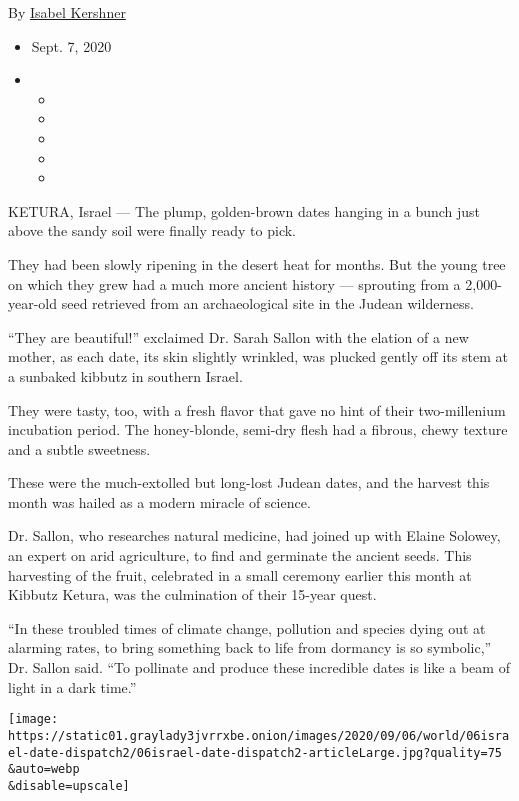 By \href{https://www.nytimes3xbfgragh.onion/by/isabel-kershner}{Isabel
Kershner}

\begin{itemize}
\item
  Sept. 7, 2020
\item
  \begin{itemize}
  \item
  \item
  \item
  \item
  \item
  \end{itemize}
\end{itemize}

KETURA, Israel --- The plump, golden-brown dates hanging in a bunch just
above the sandy soil were finally ready to pick.

They had been slowly ripening in the desert heat for months. But the
young tree on which they grew had a much more ancient history ---
sprouting from a 2,000-year-old seed retrieved from an archaeological
site in the Judean wilderness.

``They are beautiful!'' exclaimed Dr. Sarah Sallon with the elation of a
new mother, as each date, its skin slightly wrinkled, was plucked gently
off its stem at a sunbaked kibbutz in southern Israel.

They were tasty, too, with a fresh flavor that gave no hint of their
two-millenium incubation period. The honey-blonde, semi-dry flesh had a
fibrous, chewy texture and a subtle sweetness.

These were the much-extolled but long-lost Judean dates, and the harvest
this month was hailed as a modern miracle of science.

Dr. Sallon, who researches natural medicine, had joined up with Elaine
Solowey, an expert on arid agriculture, to find and germinate the
ancient seeds. This harvesting of the fruit, celebrated in a small
ceremony earlier this month at Kibbutz Ketura, was the culmination of
their 15-year quest.

``In these troubled times of climate change, pollution and species dying
out at alarming rates, to bring something back to life from dormancy is
so symbolic,'' Dr. Sallon said. ``To pollinate and produce these
incredible dates is like a beam of light in a dark time.''

\texttt{[image: https://static01.graylady3jvrrxbe.onion/images/2020/09/06/world/06israel-date-dispatch2/06israel-date-dispatch2-articleLarge.jpg?quality=75\\\&auto=webp\\\&disable=upscale]}

